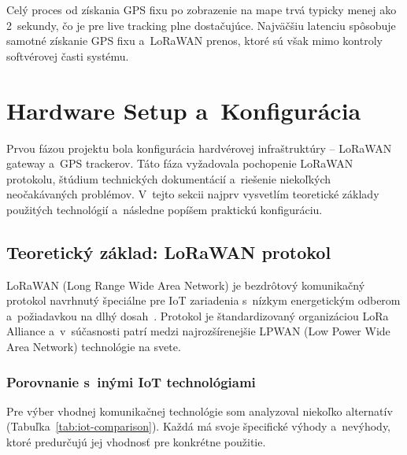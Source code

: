 Celý proces od získania GPS fixu po zobrazenie na mape trvá typicky menej ako 2~sekundy, čo je pre live tracking plne dostačujúce. Najväčšiu latenciu spôsobuje samotné získanie GPS fixu a~LoRaWAN prenos, ktoré sú však mimo kontroly softvérovej časti systému.


\section{Hardware Setup a~Konfigurácia}
\label{sec:HardwareSetup}

Prvou fázou projektu bola konfigurácia hardvérovej infraštruktúry -- LoRaWAN gateway a~GPS trackerov. Táto fáza vyžadovala pochopenie LoRaWAN protokolu, štúdium technických dokumentácií a~riešenie niekoľkých neočakávaných problémov. V~tejto sekcii najprv vysvetlím teoretické základy použitých technológií a~následne popíšem praktickú konfiguráciu.

\subsection{Teoretický základ: LoRaWAN protokol}
\label{sec:UvodLoRaWAN}

LoRaWAN (Long Range Wide Area Network) je bezdrôtový komunikačný protokol navrhnutý špeciálne pre IoT zariadenia s~nízkym energetickým odberom a~požiadavkou na dlhý dosah~\cite{lorawan_spec}. Protokol je štandardizovaný organizáciou LoRa Alliance a~v~súčasnosti patrí medzi najrozšírenejšie LPWAN (Low Power Wide Area Network) technológie na svete.

\subsubsection{Porovnanie s~inými IoT technológiami}

Pre výber vhodnej komunikačnej technológie som analyzoval niekoľko alternatív (Tabuľka~\ref{tab:iot-comparison}). Každá má svoje špecifické výhody a~nevýhody, ktoré predurčujú jej vhodnosť pre konkrétne použitie.

